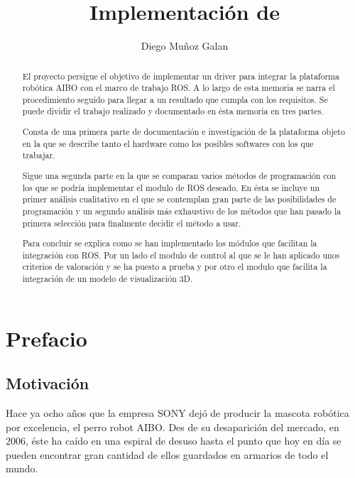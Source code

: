 \documentclass[12pt,a4paper,final,twoside]{article}
\title{Implementación de }
\author{Diego Muñoz Galan}
\begin{document}
\maketitle
\thispagestyle{empty}

\newpage
\paragraph{}
\thispagestyle{empty}
\cleardoublepage

\setcounter{page}{1}

\begin{abstract}
El proyecto persigue el objetivo de implementar un driver para integrar la plataforma robótica AIBO con el marco de trabajo ROS. A lo largo de esta memoria se narra el procedimiento seguido para llegar a un resultado que cumpla con los requisitos. 
Se puede dividir el trabajo realizado y documentado en ésta memoria en tres partes.

Consta de una primera parte de documentación e investigación de la plataforma objeto en la que se describe tanto el hardware como los posibles softwares con los que trabajar.

Sigue una segunda parte en la que se comparan varios métodos de programación con los que se podría implementar el modulo de ROS deseado. En ésta se incluye un primer análisis cualitativo en el que se contemplan gran parte de las posibilidades de programación y un segundo análisis más exhaustivo de los métodos que han pasado la primera selección para finalmente decidir el método a usar.

Para concluir se explica como se han implementado los módulos que facilitan la integración con ROS. Por un lado el modulo de control al que se le han aplicado unos criterios de valoración y se ha puesto a prueba y por otro el modulo que facilita la integración de un modelo de visualización 3D.





\end{abstract}

\newpage
\cleardoublepage

\tableofcontents
\newpage
\listoffigures
\newpage
\listoftables
\newpage


\section{Prefacio}
\subsection{Motivación}
Hace ya ocho años que la empresa SONY dejó de producir la mascota robótica por excelencia, el perro robot AIBO. Des de su desaparición del mercado, en 2006, éste ha caído en una espiral de desuso hasta el punto que hoy en día se pueden encontrar gran cantidad de ellos guardados en armarios de todo el mundo.
\end{document}
